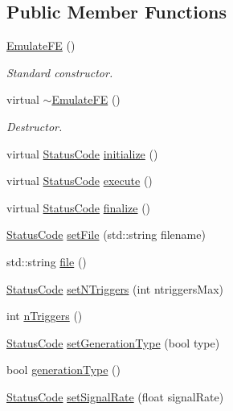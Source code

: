 \subsection*{Public Member Functions}
\begin{DoxyCompactItemize}
\item 
\hyperlink{classEmulateFE_ac6242fca0d5c30477153d1d33d5f990d}{EmulateFE} ()
\begin{DoxyCompactList}\small\item\em Standard constructor. \item\end{DoxyCompactList}\item 
virtual \hyperlink{classEmulateFE_ab0ae9c65e546ec89bb0d6d318428d578}{$\sim$EmulateFE} ()
\begin{DoxyCompactList}\small\item\em Destructor. \item\end{DoxyCompactList}\item 
virtual \hyperlink{classStatusCode}{StatusCode} \hyperlink{classEmulateFE_aeb689a366ed5e675d02d08ee787d338e}{initialize} ()
\item 
virtual \hyperlink{classStatusCode}{StatusCode} \hyperlink{classEmulateFE_a5133d5b45521fc311db62d61217848b9}{execute} ()
\item 
virtual \hyperlink{classStatusCode}{StatusCode} \hyperlink{classEmulateFE_a7d29ee79a606d0f7d337b1e78ef54a03}{finalize} ()
\item 
\hyperlink{classStatusCode}{StatusCode} \hyperlink{classEmulateFE_a33403f61dc51ffc30c008cf5782636b1}{setFile} (std::string filename)
\item 
std::string \hyperlink{classEmulateFE_a321a82d6ead6f6089693d3165d7893ec}{file} ()
\item 
\hyperlink{classStatusCode}{StatusCode} \hyperlink{classEmulateFE_a3a8b53c47db627e5a70076968d5aab53}{setNTriggers} (int ntriggersMax)
\item 
int \hyperlink{classEmulateFE_ab08924ef9529a766ce80c9c1c9885cca}{nTriggers} ()
\item 
\hyperlink{classStatusCode}{StatusCode} \hyperlink{classEmulateFE_ac4592687749d8a457430911ddf8f5e76}{setGenerationType} (bool type)
\item 
bool \hyperlink{classEmulateFE_ad3aaa46fce2848cc9280e51a7e6fa572}{generationType} ()
\item 
\hyperlink{classStatusCode}{StatusCode} \hyperlink{classEmulateFE_ad785934c216c213e504f3db72b53354f}{setSignalRate} (float signalRate)

\end{DoxyCompactItemize}
